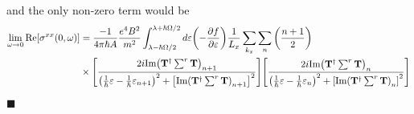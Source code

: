 and the only non-zero term would be
\begin{equation} \label{7.8}
  \begin{aligned}
    \lim_{\omega \to 0}
    \text{Re}[{\sigma}^{xx}(0,\omega)] & =
    \frac{-1}{4\pi\hbar A}
    \frac{e^4B^2}{{m^2}}
    \int_{\lambda-\hbar\Omega/2}^{\lambda+ \hbar\Omega/2} d\varepsilon
    \qty(
    -\frac{\partial f}{\partial \varepsilon})
    \frac{1}{L_x} \sum_{k_x} \sum_{n}
    \qty(\frac{n+1}{2})
    \\
    & \times
    \qty[
    \frac{2i \text{Im}\qty(\mathbf{T}^{\dagger} \sum^r \mathbf{T})_{n+1}
    }
    {
    \qty(
    \frac{1}{\hbar}\varepsilon -
    \frac{1}{\hbar}\varepsilon_{n+1}
    )^2
    + \qty[\text{Im}\qty(\mathbf{T}^{\dagger} \sum^r \mathbf{T})_{n+1}]^2
    }]
    \qty[
    \frac{2i \text{Im}\qty(\mathbf{T}^{\dagger} \sum^r \mathbf{T})_n
    }
    {
    \qty(
    \frac{1}{\hbar}\varepsilon -
    \frac{1}{\hbar}\varepsilon_{n}
    )^2
    + \qty[\text{Im}\qty(\mathbf{T}^{\dagger} \sum^r \mathbf{T})_n]^2
    }]
  \end{aligned}
\end{equation}



























\hfill$\blacksquare$
